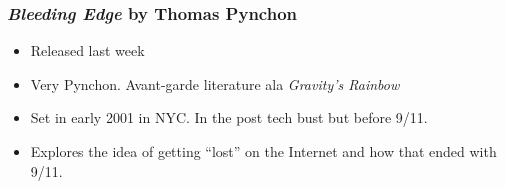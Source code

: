 \documentclass{beamer}
\begin{document}
\begin{frame}
\begin{columns}[c]
\begin{figure}
    \end{figure}

    \end{columns}



\end{frame}
\begin{frame}

\frametitle{\emph{Bleeding Edge} by Thomas Pynchon}

\begin{itemize}
\item Released last week
\item Very Pynchon.  Avant-garde literature ala \emph{Gravity's
  Rainbow}
\item Set in early 2001 in NYC.  In the post tech bust but before
  9/11.
\item Explores the idea of getting ``lost'' on the Internet and how
  that ended with 9/11.
\end{itemize}
\end{frame}









\end{document}
